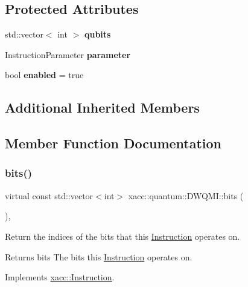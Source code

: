 \subsection*{Protected Attributes}
\begin{DoxyCompactItemize}
\item 
\mbox{\label{a00987_a5fc6e587225f365b150ef58fc7d2ed32}} 
std\+::vector$<$ int $>$ {\bfseries qubits}
\item 
\mbox{\label{a00987_a30249f83412fb56f7c8be9ec0ad726a9}} 
Instruction\+Parameter {\bfseries parameter}
\item 
\mbox{\label{a00987_ae06f0e1952dea7381cbae3cd3954de1f}} 
bool {\bfseries enabled} = true
\end{DoxyCompactItemize}
\subsection*{Additional Inherited Members}


\subsection{Member Function Documentation}
\mbox{\label{a00987_a76939c29e4763d10c57ea9a270229421}} 
\subsubsection{\texorpdfstring{bits()}{bits()}}
{\footnotesize\ttfamily virtual const std\+::vector$<$int$>$ xacc\+::quantum\+::\+D\+W\+Q\+M\+I\+::bits (\begin{DoxyParamCaption}{ }\end{DoxyParamCaption})\hspace{0.3cm}{\ttfamily [inline]}, {\ttfamily [virtual]}}

Return the indices of the bits that this \hyperlink{a01155}{Instruction} operates on.

\begin{DoxyReturn}{Returns}
bits The bits this \hyperlink{a01155}{Instruction} operates on. 
\end{DoxyReturn}


Implements \hyperlink{a01155_a819f32e94c3e1c9e69a0061aaf8d86dc}{xacc\+::\+Instruction}.

